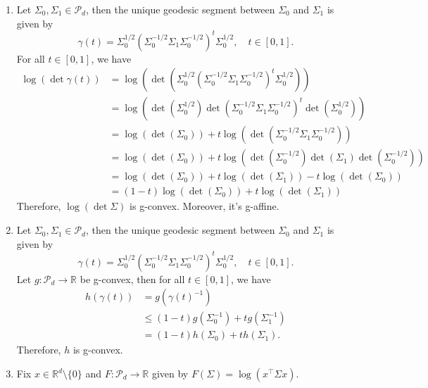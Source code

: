 \documentclass[en, oneside]{assignment}
\begin{document}
\begin{sol}
    \begin{enumerate}[label=(\arabic*)]
        \item Let $\Sigma_0, \Sigma_1 \in \mathcal P_d$, then the unique geodesic segment between $\Sigma_0$ and $\Sigma_1$ is given by
        \begin{equation*}
            \gamma(t) = \Sigma_0^{1/2} (\Sigma_0^{-1/2} \Sigma_1 \Sigma_0^{-1/2})^t \Sigma_0^{1/2}, \quad t \in [0, 1].
        \end{equation*}
        For all $t \in [0, 1]$, we have
        \begin{align*}
            \log (\det \gamma(t)) &= \log (\det (\Sigma_0^{1/2} (\Sigma_0^{-1/2} \Sigma_1 \Sigma_0^{-1/2})^t \Sigma_0^{1/2})) \\
            &= \log \left(\det (\Sigma_0^{1/2}) \det (\Sigma_0^{-1/2} \Sigma_1 \Sigma_0^{-1/2})^t \det (\Sigma_0^{1/2})\right) \\
            &= \log (\det (\Sigma_0)) + t \log (\det (\Sigma_0^{-1/2} \Sigma_1 \Sigma_0^{-1/2})) \\
            &= \log (\det (\Sigma_0)) + t \log \left(\det (\Sigma_0^{-1/2}) \det (\Sigma_1) \det (\Sigma_0^{-1/2})\right) \\
            &= \log (\det (\Sigma_0)) + t \log (\det (\Sigma_1)) - t \log (\det (\Sigma_0)) \\
            &= (1 - t) \log (\det (\Sigma_0)) + t \log (\det (\Sigma_1))
        \end{align*}
        Therefore, $\log (\det \Sigma)$ is g-convex. Moreover, it's g-affine.
        \item Let $\Sigma_0, \Sigma_1 \in \mathcal P_d$, then the unique geodesic segment between $\Sigma_0$ and $\Sigma_1$ is given by
        \begin{equation*}
            \gamma(t) = \Sigma_0^{1/2} (\Sigma_0^{-1/2} \Sigma_1 \Sigma_0^{-1/2})^t \Sigma_0^{1/2}, \quad t \in [0, 1].
        \end{equation*}
        Let $g: \mathcal P_d \rightarrow \mathbb R$ be g-convex, then for all $t \in [0, 1]$, we have
        \begin{align*}
            h(\gamma(t)) &= g(\gamma(t)^{-1}) \\
            &\leq (1-t) g(\Sigma_0^{-1}) + t g(\Sigma_1^{-1}) \\
            &= (1-t) h(\Sigma_0) + t h(\Sigma_1).
        \end{align*}
        Therefore, $h$ is g-convex.
        \item Fix $x \in \mathbb R^d \setminus \{0\}$ and $F: \mathcal P_d \rightarrow \mathbb R$ given by $F(\Sigma) = \log (x^\top \Sigma x)$.

\end{enumerate}
\end{sol}
\end{document}

